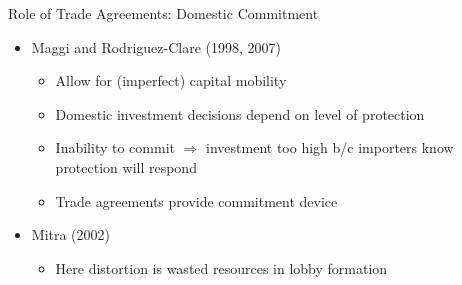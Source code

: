 \documentclass{beamer}
\begin{document}

\begin{frame}{Role of Trade Agreements: Domestic Commitment}
\pause
\begin{itemize}[<+->]
	\item Maggi and Rodriguez-Clare (1998, 2007)
		\begin{itemize}
			\item Allow for (imperfect) capital mobility
			\item Domestic investment decisions depend on level of protection
			\item Inability to commit $\Rightarrow$ investment too high b/c importers know protection will respond
			\item Trade agreements provide commitment device
    \end{itemize}
	\item Mitra (2002)
		\begin{itemize}
			\item Here distortion is wasted resources in lobby formation
		\end{itemize}
\end{itemize}
\end{frame} 
\end{document}
